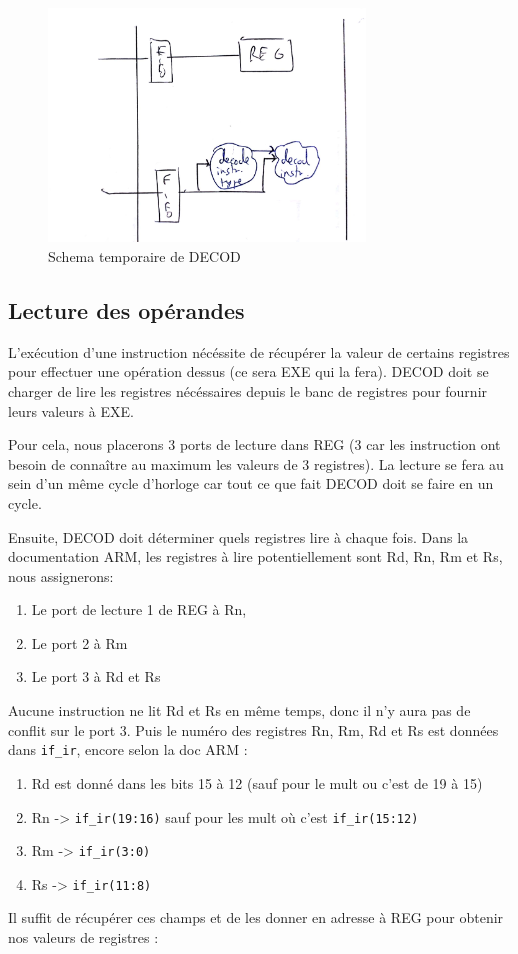 \documentclass{article}
\begin{document}
\begin{figure}[H]
\includegraphics[width=0.75\textwidth]{pics/dec3.png}
\centering
\caption{Schema temporaire de DECOD}
\label{dec3}
\end{figure}


\subsection{Lecture des opérandes}

L'exécution d'une instruction nécéssite de récupérer la valeur de certains registres pour
effectuer une opération dessus (ce sera EXE qui la fera). DECOD doit se charger
de lire les registres nécéssaires depuis le banc de registres pour fournir leurs valeurs à EXE.

Pour cela, nous placerons 3 ports de lecture dans REG (3 car les instruction ont besoin de
connaître au maximum les valeurs de 3 registres). La lecture se fera au sein d'un même cycle d'horloge
car tout ce que fait DECOD doit se faire en un cycle.

Ensuite, DECOD doit déterminer quels registres lire à chaque fois.
Dans la documentation ARM, les registres à lire potentiellement sont Rd, Rn, Rm et Rs,
nous assignerons:
\begin{enumerate}
  \item Le port de lecture 1 de REG     à Rn,
  \item Le port 2 à Rm
  \item Le port 3 à Rd et Rs
\end{enumerate}
Aucune instruction ne lit Rd et Rs en même temps, donc il n'y aura pas de conflit sur le port 3.
Puis le numéro des registres Rn, Rm, Rd et Rs est données dans \texttt{if\_ir}, encore selon la doc ARM :
\begin{enumerate}
  \item Rd est donné dans les bits 15 à 12 (sauf pour le mult ou c'est de 19 à 15)
  \item Rn -> \texttt{if\_ir(19:16)} sauf pour les mult où c'est \texttt{if\_ir(15:12)}
  \item Rm -> \texttt{if\_ir(3:0)}
  \item Rs -> \texttt{if\_ir(11:8)}
\end{enumerate}
Il suffit de récupérer ces champs et de les donner en adresse à REG pour obtenir nos valeurs de registres :
\end{document}
